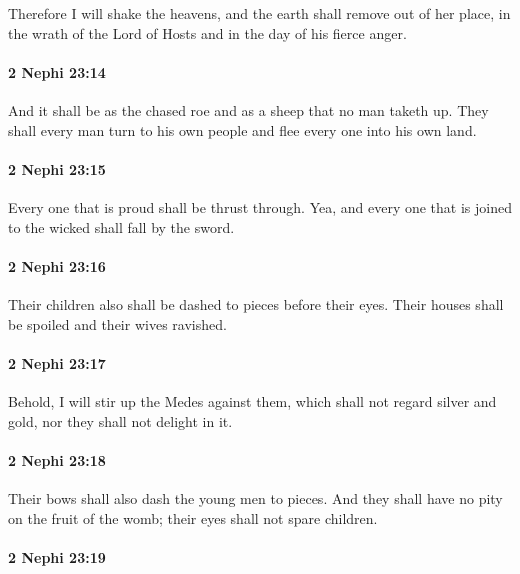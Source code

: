 			Therefore I will shake the heavens,
			and the earth shall remove out of her place,
			in the wrath of the Lord of Hosts and in the day of his fierce anger.

		\paragraph{2 Nephi 23:14} %
			\label{2NEPHI-23-14}

			And it shall be as the chased roe and as a sheep that no man taketh up.
			They shall every man turn to his own people
			and flee every one into his own land.

		\paragraph{2 Nephi 23:15} %
			\label{2NEPHI-23-15}

			Every one that is proud shall be thrust through.
			Yea, and every one that is joined to the wicked shall fall by the sword.

		\paragraph{2 Nephi 23:16} %
			\label{2NEPHI-23-16}

			Their children also shall be dashed to pieces before their eyes.
			Their houses shall be spoiled and their wives ravished.

		\paragraph{2 Nephi 23:17} %
			\label{2NEPHI-23-17}

			Behold, I will stir up the Medes against them,
			which shall not regard silver and gold,
			nor they shall not delight in it.

		\paragraph{2 Nephi 23:18} %
			\label{2NEPHI-23-18}

			Their bows shall also dash the young men to pieces.
			And they shall have no pity on the fruit of the womb;
			their eyes shall not spare children.

		\paragraph{2 Nephi 23:19} %
			\label{2NEPHI-23-19}


